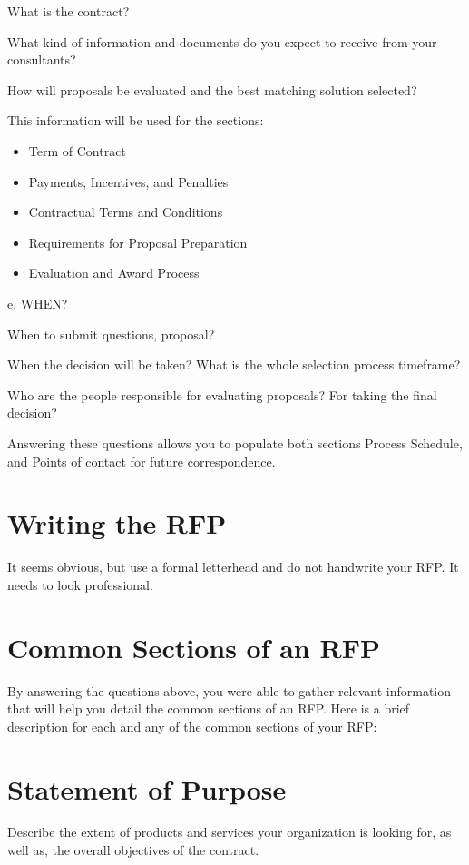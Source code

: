 \documentclass[10pt]{article}
\begin{document}
What is the contract?

What kind of information and documents do you expect to receive from your consultants?

How will proposals be evaluated and the best matching solution selected?

This information will be used for the sections:

\begin{itemize}
  \item Term of Contract

  \item Payments, Incentives, and Penalties

  \item Contractual Terms and Conditions

  \item Requirements for Proposal Preparation

  \item Evaluation and Award Process

\end{itemize}
e. WHEN?

When to submit questions, proposal?

When the decision will be taken? What is the whole selection process timeframe?

Who are the people responsible for evaluating proposals? For taking the final decision?

Answering these questions allows you to populate both sections Process Schedule, and Points of contact for future correspondence.

\section{Writing the RFP}
It seems obvious, but use a formal letterhead and do not handwrite your RFP. It needs to look professional.

\section{Common Sections of an RFP}
By answering the questions above, you were able to gather relevant information that will help you detail the common sections of an RFP. Here is a brief description for each and any of the common sections of your RFP:

\section{Statement of Purpose}
Describe the extent of products and services your organization is looking for, as well as, the overall objectives of the contract.
\end{document}
